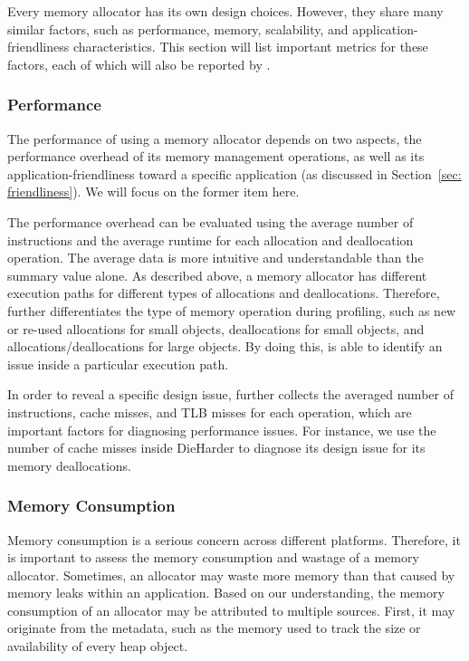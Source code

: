 \label{sec:factors}

Every memory allocator has its own design choices. However, they share many similar factors, such as performance, memory, scalability, and application-friendliness characteristics. This section will list important metrics for these factors, each of which will also be reported by \MP{}. 

\subsubsection{Performance}
\label{sec:performance}

The performance of using a memory allocator depends on two aspects, the performance overhead of its memory management operations, as well as its application-friendliness toward a specific application (as discussed in Section~\ref{sec: friendliness}). We will focus on the former item here. 

The performance overhead can be evaluated using the average number of instructions and the average runtime for each allocation and deallocation operation. The average data is more intuitive and understandable than the summary value alone. As described above, a memory allocator has different execution paths for different types of allocations and deallocations. Therefore, \MP{} further differentiates the type of memory operation during profiling, such as new or re-used allocations for small objects, deallocations for small objects, and allocations/deallocations for large objects. By doing this, \MP{} is able to identify an issue inside a particular execution path.

In order to reveal a specific design issue, \MP{} further collects the averaged number of instructions, cache misses, and TLB misses for each operation, which are important factors for diagnosing performance issues. For instance, we use the number of cache misses inside DieHarder to diagnose its design issue for its memory deallocations. 

\subsubsection{Memory Consumption}
\label{sec:memoryconsumption}

Memory consumption is a serious concern across different platforms. Therefore, it is important to assess the memory consumption and wastage of a memory allocator. Sometimes, an allocator may waste more memory than that caused by memory leaks within an application. Based on our understanding, the memory consumption of an allocator may be attributed to multiple sources. First, it may originate from the metadata, such as the memory used to track the size or availability of every heap object. 

